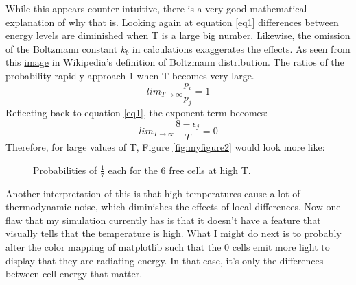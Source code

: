 \vspace{0.3cm}
\noindent
While this appears counter-intuitive, there is a very good mathematical explanation of why that is. Looking again at equation \ref{eq1} differences between energy levels are diminished when T is a large big number. Likewise, the omission of the Boltzmann constant $k_{b}$ in calculations exaggerates the effects. As seen from this \href{https://en.wikipedia.org/wiki/Boltzmann_distribution#/media/File:Boltzmann_distribution_graph.svg}{image} in Wikipedia's definition of Boltzmann distribution. The ratios of the probability rapidly approach 1 when T becomes very large.  
$$lim_{T\to\infty} \frac{p_{i}}{p_{j}}=1$$
Reflecting back to equation \ref{eq1}, the exponent term becomes: 
$$lim_{T\to\infty} \frac{8-\epsilon_{j}}{T}=0$$
Therefore, for large values of T, Figure \ref{fig:myfigure2} would look more like: 
\begin{figure}[H]
\centering %
\caption{\small {Probabilities of $\frac{1}{7}$ each for the 6 free cells at high T.}}
\label{fig:altered_prob}
\end{figure}
Another interpretation of this is that high temperatures cause a lot of thermodynamic noise, which diminishes the effects of local differences. Now one flaw that my simulation currently has is that it doesn't have a feature that visually tells that the temperature is high. What I might do next is to probably alter the color mapping of matplotlib such that the 0 cells emit more light to display that they are radiating energy. In that case, it's only the differences between cell energy that matter. 